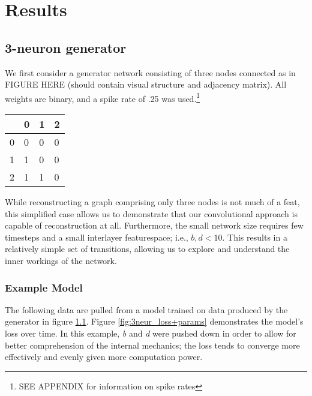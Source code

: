 \graphicspath{ {resources/models/3neurEx/9/} } 

\chapter{Results}
\label{results}
\section{3-neuron generator}
\label{results_3neur}
We first consider a generator network consisting of three nodes connected as in 
FIGURE HERE (should contain visual structure and adjacency matrix). All weights 
are binary, and a spike rate of .25 was used.\footnote{SEE APPENDIX	for 
information on spike rates}

\begin{table}[h]
	\centering
	
	\hspace{2em}
	\begin{tabular}{l|lll}
		  & 0 & 1 & 2\\
		\hline
		0 & 0 & 0 & 0\\
		1 & 1 & 0 & 0\\
		2 & 1 & 1 & 0
	\end{tabular}
	\label{fig:2simplex+adjacency}
\end{table}

While reconstructing a graph comprising only three nodes is not much of a feat, 
this simplified case allows us to demonstrate that our convolutional approach is 
capable of reconstruction at all. Furthermore, the small network size requires 
few timesteps and a small interlayer featurespace; i.e., $b,d<10$. This results 
in a relatively simple set of transitions, allowing us to explore and understand 
the inner workings of the network.

\subsection{Example Model}
\label{subsec:3neurex}
The following data are pulled from a model trained on data produced by the 
generator in figure \ref{fig:2simplex+adjacency}. Figure 
\ref{fig:3neur_loss+params} demonstrates the model's loss over time. In this 
example, \textit{b} and \textit{d} were pushed down in order to allow for better 
comprehension of the internal mechanics; the loss tends to converge more 
effectively and evenly given more computation power.


